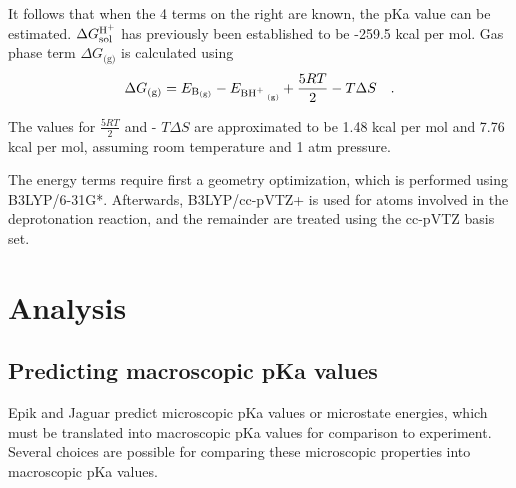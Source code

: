 \documentclass[9pt,lineno,final]{elife}
\begin{document}
It follows that when the 4 terms on the right are known, the pKa value can be estimated.
%
$\Delta G^\textrm{\ce{H+}}_\textrm{sol}$ has previously been established to be -259.5 kcal per mol\cite{Lim1991protonsolvation}.
%
Gas phase term $\Delta G_\textrm{(g)}$ is calculated using
%
\begin{equation}
 \Delta G_\textrm{(g)} = E_\textrm{\ce{B_{(g)}}} - E_\textrm{\ce{BH+ _{(g)}}} + \frac{5RT}{2 } - T \Delta S \quad .
\end{equation}

The values for $\frac{5RT}{2}$ and  - $T \Delta S$ are approximated to be 1.48 kcal per mol and 7.76 kcal per mol, assuming room temperature and 1 atm pressure.~\cite{Bochevarov2016multiconformation}

The energy terms require first a geometry optimization, which is performed using B3LYP/6-31G*. 
%
Afterwards, B3LYP/cc-pVTZ+ is used for atoms involved in the deprotonation reaction, and the remainder are treated using the cc-pVTZ basis set.
%


\section{Analysis}

\subsection{Predicting macroscopic pKa values}


Epik and Jaguar predict microscopic pKa values or microstate energies, which must be translated into macroscopic pKa values for comparison to experiment.
Several choices are possible for comparing these microscopic properties into macroscopic pKa values.
%
\end{document}
